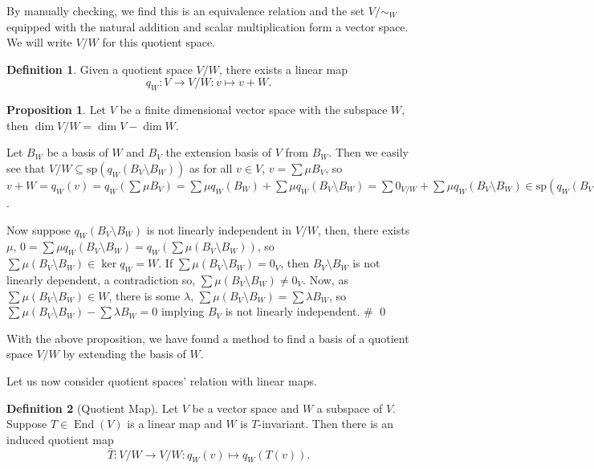 \documentclass[
]{article}
\theoremstyle{definition}
\newtheorem{prop}{Proposition}[section]
\theoremstyle{definition}
\newtheorem{definition}{Definition}[section]
\begin{document}
By manually checking, we find this is an equivalence relation and the
set \(V / \sim_W\) equipped with the natural addition and scalar
multiplication form a vector space. We will write \(V / W\) for this
quotient space.

\begin{definition}
  Given a quotient space \(V / W\), there exists a linear map
  \[q_W : V \to V / W : v \mapsto v + W.\]
\end{definition}

\begin{prop}\label{dim_sub}
  Let \(V\) be a finite dimensional vector space with the subspace \(W\), 
  then \(\dim V / W = \dim V - \dim W\).
\end{prop}
\proof

Let \(B_W\) be a basis of \(W\) and \(B_V\) the extension basis of \(V\)
from \(B_W\). Then we easily see that
\(V / W \subseteq \text{sp}(q_W(B_V \setminus B_W))\) as for all
\(v \in V\), \(v = \sum \mu B_V\), so
\(v + W = q_W(v) = q_W(\sum \mu B_V) =  \sum \mu q_W(B_W) + \sum \mu q_W(B_V \setminus B_W) = \sum 0_{V / W} +  \sum \mu q_W(B_V \setminus B_W) \in \text{sp}(q_W(B_V \setminus B_W))\).

Now suppose \(q_W(B_V \setminus B_W)\) is not linearly independent in
\(V / W\), then, there exists \(\mu\),
\(0 = \sum \mu q_W(B_V \setminus B_W) =  q_W (\sum \mu (B_V \setminus B_W))\),
so \(\sum \mu (B_V \setminus B_W) \in  \ker q_W = W\). If
\(\sum \mu (B_V \setminus B_W) = 0_V\), then \(B_V \setminus B_W\) is
not linearly dependent, a contradiction so,
\(\sum \mu (B_V \setminus B_W) \neq 0_V\). Now, as
\(\sum \mu (B_V \setminus B_W) \in W\), there is some \(\lambda\),
\(\sum \mu (B_V \setminus B_W) = \sum \lambda B_W\), so
\(\sum \mu (B_V \setminus B_W) - \sum \lambda B_W = 0\) implying \(B_V\)
is not linearly independent. \# \qed

With the above proposition, we have found a method to find a basis of a
quotient space \(V / W\) by extending the basis of \(W\).

Let us now consider quotient spaces' relation with linear maps.

\begin{definition}[Quotient Map]
  Let \(V\) be a vector space and \(W\) a subspace of \(V\). Suppose 
  \(T \in \mathop{\mathrm{End}}(V)\) is a linear map and \(W\) is \(T\)-invariant. Then there 
  is an induced quotient map 
  \[\bar{T} : V / W \to V / W : q_W(v) \mapsto q_W(T(v)).\]
\end{definition}
\end{document}
